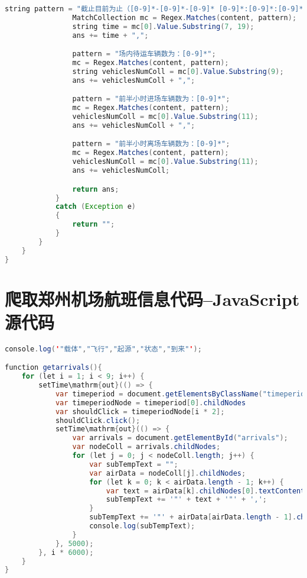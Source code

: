 \documentclass{cumcmthesis}
\begin{document}
\begin{appendices}
\begin{lstlisting}[language=java]
                string pattern = "截止目前为止（[0-9]*-[0-9]*-[0-9]* [0-9]*:[0-9]*:[0-9]*）";
                MatchCollection mc = Regex.Matches(content, pattern);
                string time = mc[0].Value.Substring(7, 19);
                ans += time + ",";

                pattern = "场内待运车辆数为：[0-9]*";
                mc = Regex.Matches(content, pattern);
                string vehiclesNumColl = mc[0].Value.Substring(9);
                ans += vehiclesNumColl + ",";

                pattern = "前半小时进场车辆数为：[0-9]*";
                mc = Regex.Matches(content, pattern);
                vehiclesNumColl = mc[0].Value.Substring(11);
                ans += vehiclesNumColl + ",";

                pattern = "前半小时离场车辆数为：[0-9]*";
                mc = Regex.Matches(content, pattern);
                vehiclesNumColl = mc[0].Value.Substring(11);
                ans += vehiclesNumColl;

                return ans;
            }
            catch (Exception e)
            {
                return "";
            }
        }
    }
}

\end{lstlisting}

	\section{爬取郑州机场航班信息代码--JavaScript 源代码}
	\begin{lstlisting}[language=java]
console.log('"载体","飞行","起源","状态","到来"');

function getarrivals(){
    for (let i = 1; i < 9; i++) {
        setTime\mathrm{out}(() => {
            var timeperiod = document.getElementsByClassName("timeperiod");
            var timeperiodNode = timeperiod[0].childNodes
            var shouldClick = timeperiodNode[i * 2];
            shouldClick.click();
            setTime\mathrm{out}(() => {
                var arrivals = document.getElementById("arrivals");
                var nodeColl = arrivals.childNodes;
                for (let j = 0; j < nodeColl.length; j++) {
                    var subTempText = "";
                    var airData = nodeColl[j].childNodes;
                    for (let k = 0; k < airData.length - 1; k++) {
                        var text = airData[k].childNodes[0].textContent;
                        subTempText += '"' + text + '"' + ',';
                    }
                    subTempText += '"' + airData[airData.length - 1].childNodes[0].textContent + '"';
                    console.log(subTempText);
                }
            }, 5000);
        }, i * 6000);
    }    
}


\end{lstlisting}
\end{appendices}
\end{document}
